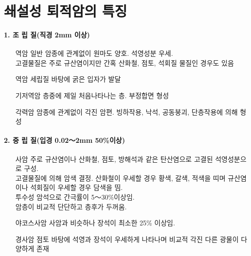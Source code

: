 \documentclass[12pt, a4paper, twoside]{book}
\begin{document}
	\clearpage
	\section{쇄설성 퇴적암의 특징}


		\paragraph{1. 조 립 질(직경 2mm 이상)}

			\begin{itemize}[topsep=0.0em, parsep=0.0em, itemsep=0em, leftmargin=10.0em, labelwidth=3em, labelsep=3em] 
			\item [역암 일반] 	암종에 관계없이 원마도 양호. 석영성분 우세.\\
							고결물질은 주로 규산염이지만 간혹 산화철, 점토, 석회질 물질인 경우도 있음 
			\item [역암]		세립질 바탕에 굵은 입자가 발달
			\item [기저역암]	층중에 제일 처음나타나는 층. 부정합면 형성
			\item [각력암]		암종에 관계없이 각진 암편. 빙하작용, 낙석, 공동붕괴, 단층작용에 의해 형성
			\end{itemize}


		\paragraph{2. 중 립 질(입경 0.02～2mm 50\%이상)}

			\begin{itemize}[topsep=0.0em, parsep=0.0em, itemsep=0em, leftmargin=10.0em, labelwidth=3em, labelsep=3em] 
			\item [사암]		주로 규산염이나 산화철, 점토, 방해석과 같은 탄산염으로 고결된 석영성분으로 구성.\\
							고결물질에 의해 암색 결정. 산화철이 우세할 경우 황색, 갈색, 적색을 띠며 규산염이나 석회질이 우세할 경우 담색을 띰.  \\
							투수성 암석으로 간극률이 5～30\%이상임. \\
							암층이 비교적 단단하고 층후가 두꺼움.
			\item [야코스사암]	사암과 비슷하나 장석이 최소한 25\% 이상임.
			\item [경사암]		점토 바탕에 석영과 장석이 우세하게 나타나며 비교적 각진 다른 광물이 다양하게 존재
			\end{itemize}
			
\end{document}
